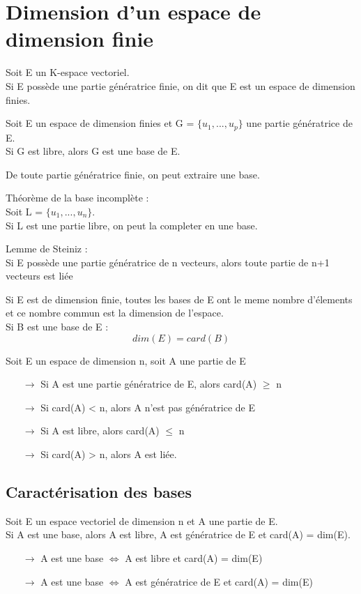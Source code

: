 \section{Dimension d'un espace de dimension finie}
\begin{de}
Soit E un K-espace vectoriel.\\
Si E possède une partie génératrice finie, on dit que E est un espace de dimension finies.
\end{de}
\begin{prop}
Soit E un espace de dimension finies et G = $\{ u_1,...,u_p \}$ une partie génératrice de E.\\
Si G est libre, alors G est une base de E.
\end{prop}
\begin{prop}
De toute partie génératrice finie, on peut extraire une base.
\end{prop}
\begin{theo}
Théorème de la base incomplète :\\
Soit L = $\{ u_1,...,u_n \}$.\\
Si L est une partie libre, on peut la completer en une base.
\end{theo}
\begin{prop}
Lemme de Steiniz :\\
Si E possède une partie génératrice de n vecteurs, alors toute partie de n+1 vecteurs est liée
\end{prop}
\begin{theo}
 Si E est de dimension finie, toutes les bases de E ont le meme nombre d'élements et ce nombre commun est la dimension de l'espace.\\
Si B est une base de E :
$$dim(E) = card(B)$$
\end{theo}
\begin{prop}
Soit E un espace de dimension n, soit A une partie de E 
\begin{itemize}
 \item[$\rightarrow$] Si A est une partie génératrice de E, alors card(A) $\geq$ n
 \item[$\rightarrow$] Si card(A) < n, alors A n'est pas génératrice de E
 \item[$\rightarrow$] Si A est libre, alors card(A) $\leq$ n
 \item[$\rightarrow$] Si card(A) > n, alors A est liée.
\end{itemize}
\end{prop}
\subsection{Caractérisation des bases}
Soit E un espace vectoriel de dimension n et A une partie de E.\\
Si A est une base, alors A est libre, A est génératrice de E et card(A) = dim(E).\\
\begin{itemize}
 \item[$\rightarrow$] A est une base $\Leftrightarrow$ A est libre et card(A) = dim(E)
 \item[$\rightarrow$] A est une base $\Leftrightarrow$ A est génératrice de E et card(A) = dim(E)
\end{itemize}
